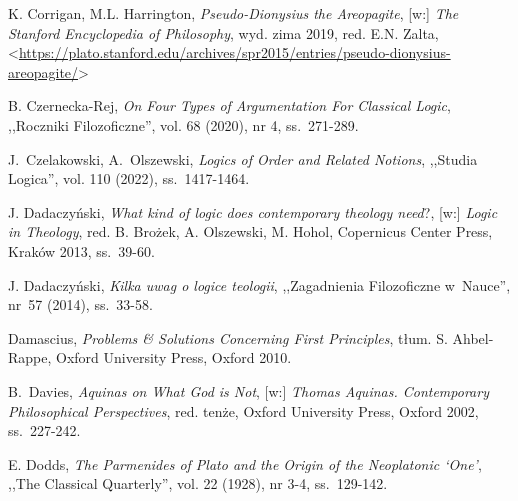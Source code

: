 \begin{thebibliography}{100}
K. Corrigan, M.L. Harrington, \textit{Pseudo-Dionysius the Areopagite}, [w:] \textit{The Stanford Encyclopedia of Philosophy},
wyd. zima 2019, red. E.N. Zalta, {\textless}\url{https://plato.stanford.edu/archives/spr2015/entries/pseudo-dionysius-areopagite/}{\textgreater}

B. Czernecka-Rej, \textit{On Four Types of Argumentation For Classical Logic}, ,,Roczniki Filozoficzne'', vol. 68 (2020), nr 4, ss.~271-289.

J.~Czelakowski, A.~Olszewski, \textit{Logics of Order and Related Notions}, ,,Studia Logica'', vol. 110 (2022), ss.~1417-1464.

J. Dadaczyński, \textit{What kind of logic does contemporary theology need}?, [w:] \textit{Logic in Theology}, red. B. Brożek, A. Olszewski, M. Hohol, Copernicus Center Press, Kraków 2013, ss.~39-60.

J. Dadaczyński, \textit{Kilka uwag o logice teologii}, ,,Zagadnienia Filozoficzne w~Nauce'', nr~57 (2014), ss.~33-58.

Damascius, \textit{Problems \& Solutions Concerning First Principles}, tłum. S. Ahbel-Rappe, Oxford University Press, Oxford 2010.

B.~Davies, \textit{Aquinas on What God is Not}, [w:]  \textit{Thomas Aquinas. Contemporary Philosophical Perspectives}, red. tenże, Oxford University Press, Oxford 2002, ss.~227-242.


E. Dodds, \textit{The Parmenides of Plato and the Origin of the Neoplatonic ‘One'}, ,,The Classical Quarterly'', vol. 22 (1928), nr 3-4, ss.~129-142.




\end{thebibliography}
